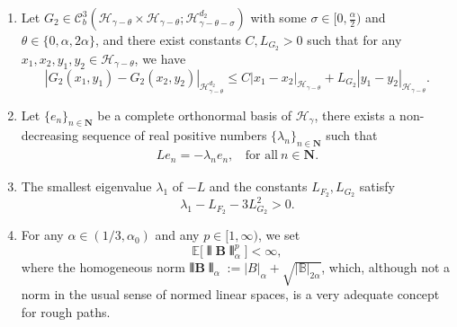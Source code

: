 \documentclass[10pt,a4paper]{article}
\numberwithin{equation}{section}
\begin{document}
\begin{enumerate}
	
	

	
\item [$(\mathbf{H3})$] Let
		$G_2 \in \mathcal C_b^3(\mathcal{H}_{\gamma-\theta} \times \mathcal{H}_{\gamma-\theta}; \mathcal{H}_{\gamma-\theta-\sigma}^{d_2})$ with some $\sigma \in [0,\frac \alpha2)$ and $\theta \in \{0,\alpha, 2\alpha\}$,
	and there exist constants $C, L_{G_2}>0$ such that for any $x_1,x_2,y_1,y_2 \in \mathcal{H}_{\gamma-\theta}$, we have
	\begin{equation*}%
		|G_2(x_1,y_1)-G_2(x_2,y_2)|_{\mathcal{H}_{\gamma-\theta}^{d_2} } \leq  C|x_1-x_2|_{\mathcal H_{\gamma-\theta}}+L_{G_2}|y_1-y_2|_{\mathcal H_{\gamma-\theta}}.
	\end{equation*}	
	
	
	
	
	
	\item [$(\mathbf{H4})$] Let $\{e_n\}_{n \in \mathbf N}$ be a complete orthonormal basis of $\mathcal{H}_{\gamma}$, there exists a non-decreasing sequence of real positive numbers $\{ \lambda_n\}_{n \in \mathbf N}$ such that
	\begin{align*}
		L e_n=-\lambda_n e_n, ~~~~\text{for all}~ n \in \mathbf N.
	\end{align*}
	
	
	\item[$(\mathbf{H5})$] The smallest eigenvalue $\lambda_1$ of $-L$ and the constants $L_{F_2},L_{G_2}$ satisfy
	$$ \lambda_1- L_{F_2}-3 L_{G_2}^2 >0.$$
	
	
	\item[$(\mathbf{H6})$] For any $\alpha \in (1/3,\alpha_0)$ and any $p\in [1,\infty)$, we set
	$$\mathbb E\big[\interleave \mathbf{B} \interleave_\alpha^p \big] <\infty,$$
	where the homogeneous norm $\interleave \mathbf{B} \interleave_\alpha:=|B|_\alpha +\sqrt{ |\mathbb B|_{2\alpha} }$,
	which, although not a norm in the usual sense of normed linear spaces, is a very adequate concept for rough paths.
	
	
	
\end{enumerate}
\end{document}
